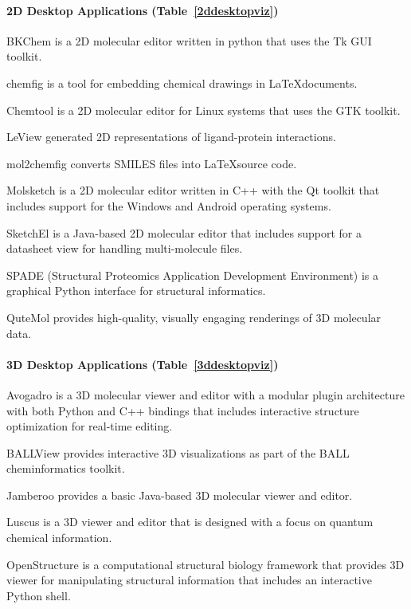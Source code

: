 \paragraph{2D Desktop Applications (Table~\ref{2ddesktopviz})}

BKChem is a 2D molecular editor written in python that uses the Tk GUI toolkit.

chemfig is a tool for embedding chemical drawings in \LaTeX documents.

Chemtool is a 2D molecular editor for Linux systems that uses the GTK toolkit.

LeView \cite{Caboche_2013} generated 2D representations of ligand-protein interactions.

mol2chemfig \cite{Brefo_Mensah_2012} converts SMILES files into \LaTeX source code.

Molsketch is a 2D molecular editor written in C++ with the Qt toolkit that includes support for the Windows and Android operating systems.

SketchEl is a Java-based 2D molecular editor that includes support for a datasheet view for handling multi-molecule files.

SPADE (Structural Proteomics Application Development Environment) \cite{sweeney2011computational} is a graphical Python interface for structural informatics.

QuteMol \cite{Tarini_2006} provides high-quality, visually engaging renderings of 3D molecular data.


\paragraph{3D Desktop Applications (Table~\ref{3ddesktopviz})}

Avogadro \cite{Hanwell_2012} is a 3D molecular viewer and editor with a modular plugin architecture with both Python and C++ bindings that includes interactive structure optimization for real-time editing. 

BALLView \cite{Moll_2005} provides interactive 3D visualizations as part of the BALL \cite{Hildebrandt_2010} cheminformatics toolkit.

Jamberoo provides a basic Java-based 3D molecular viewer and editor.

Luscus \cite{Kova_evi__2015} is a 3D viewer and editor that is designed with a focus on quantum chemical information.

OpenStructure \cite{Biasini_2013} is a computational structural biology framework that provides 3D viewer for manipulating structural information that includes an interactive Python shell.

